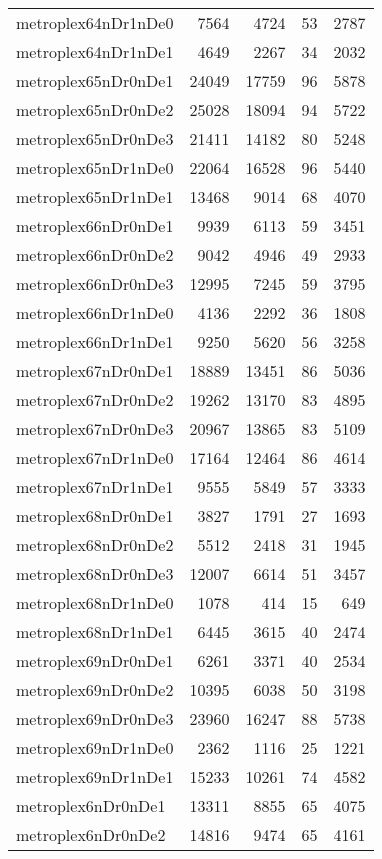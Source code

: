 \begin{tabular}{lrrrr}
metroplex64nDr1nDe0 & 7564 & 4724 & 53 & 2787 \\
metroplex64nDr1nDe1 & 4649 & 2267 & 34 & 2032 \\
metroplex65nDr0nDe1 & 24049 & 17759 & 96 & 5878 \\
metroplex65nDr0nDe2 & 25028 & 18094 & 94 & 5722 \\
metroplex65nDr0nDe3 & 21411 & 14182 & 80 & 5248 \\
metroplex65nDr1nDe0 & 22064 & 16528 & 96 & 5440 \\
metroplex65nDr1nDe1 & 13468 & 9014 & 68 & 4070 \\
metroplex66nDr0nDe1 & 9939 & 6113 & 59 & 3451 \\
metroplex66nDr0nDe2 & 9042 & 4946 & 49 & 2933 \\
metroplex66nDr0nDe3 & 12995 & 7245 & 59 & 3795 \\
metroplex66nDr1nDe0 & 4136 & 2292 & 36 & 1808 \\
metroplex66nDr1nDe1 & 9250 & 5620 & 56 & 3258 \\
metroplex67nDr0nDe1 & 18889 & 13451 & 86 & 5036 \\
metroplex67nDr0nDe2 & 19262 & 13170 & 83 & 4895 \\
metroplex67nDr0nDe3 & 20967 & 13865 & 83 & 5109 \\
metroplex67nDr1nDe0 & 17164 & 12464 & 86 & 4614 \\
metroplex67nDr1nDe1 & 9555 & 5849 & 57 & 3333 \\
metroplex68nDr0nDe1 & 3827 & 1791 & 27 & 1693 \\
metroplex68nDr0nDe2 & 5512 & 2418 & 31 & 1945 \\
metroplex68nDr0nDe3 & 12007 & 6614 & 51 & 3457 \\
metroplex68nDr1nDe0 & 1078 & 414 & 15 & 649 \\
metroplex68nDr1nDe1 & 6445 & 3615 & 40 & 2474 \\
metroplex69nDr0nDe1 & 6261 & 3371 & 40 & 2534 \\
metroplex69nDr0nDe2 & 10395 & 6038 & 50 & 3198 \\
metroplex69nDr0nDe3 & 23960 & 16247 & 88 & 5738 \\
metroplex69nDr1nDe0 & 2362 & 1116 & 25 & 1221 \\
metroplex69nDr1nDe1 & 15233 & 10261 & 74 & 4582 \\
metroplex6nDr0nDe1 & 13311 & 8855 & 65 & 4075 \\
metroplex6nDr0nDe2 & 14816 & 9474 & 65 & 4161 \\

\end{tabular}
